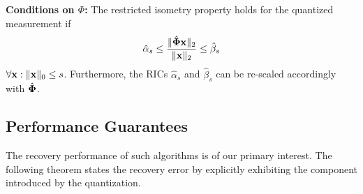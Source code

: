 \documentclass[aoas,preprint]{imsart}
\numberwithin{equation}{section}
\theoremstyle{plain}
\begin{document}
 
{\bf Conditions on ${\Phi}$:} The restricted isometry property holds for the quantized measurement if
\begin{equation}
    \hat{\alpha}_{s} \leq \frac{\|\hat{{\bf \Phi}} {\bf x}\|_2}{\|{\bf x}\|_2} \leq \hat{\beta}_{s}
\end{equation}
$\forall {\bf x}: \| {\bf x}\|_0 \leq s$. Furthermore, the RICs $\hat{\alpha}_s$ and $\hat{\beta}_s$ can be re-scaled accordingly with $\hat{\bf \Phi}$.

\subsection{Performance Guarantees}
The recovery performance of such algorithms is of our primary interest. The following theorem states the recovery error by explicitly exhibiting the component introduced by the quantization.
\end{document}
